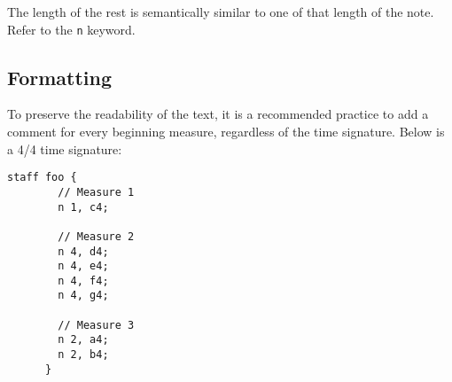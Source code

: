 \np The length of the rest is semantically similar to one of that length
of the note. Refer to the \verb+n+ keyword.

\subsection{Formatting}
\label{formatting}
\np To preserve the readability of the text, it is a recommended practice to add a comment for every
beginning measure, regardless of the time signature. Below is a 4/4 time signature:
\begin{Verbatim}[frame=single]
      staff foo {
        // Measure 1
        n 1, c4;
  
        // Measure 2
        n 4, d4;
        n 4, e4;
        n 4, f4;
        n 4, g4;
  
        // Measure 3
        n 2, a4;
        n 2, b4;
      }
\end{Verbatim}


